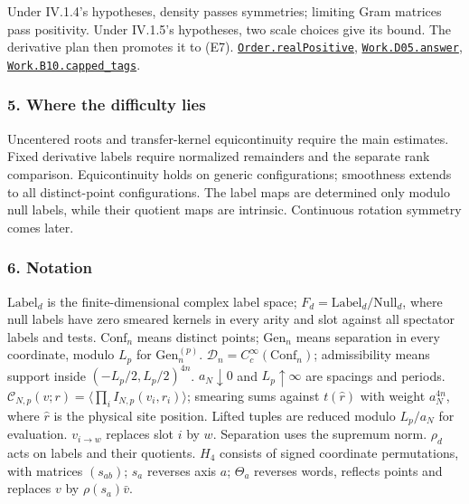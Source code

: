 \documentclass[
  letterpaper,
  11pt]{article}
\begin{document}
\begin{enumerate}
  Under IV.1.4's hypotheses, density passes symmetries; limiting Gram
  matrices pass positivity. Under IV.1.5's hypotheses, two scale choices
  give its bound. The derivative plan then promotes it to (E7).
  \href{https://github.com/yang-mills-group/OpenAI-YM-20261028/blob/3456e5e75cf8d4cd558955a5c7638fba2d68f464/YM/Extraction/Harvest.lean\#L46-L60}{\texttt{Order.realPositive}},
  \href{https://github.com/yang-mills-group/OpenAI-YM-20261028/blob/3456e5e75cf8d4cd558955a5c7638fba2d68f464/YM/Work/D05.lean\#L160-L180}{\texttt{Work.D05.answer}},
  \href{https://github.com/yang-mills-group/OpenAI-YM-20261028/blob/3456e5e75cf8d4cd558955a5c7638fba2d68f464/YM/Work/B10.lean\#L72-L90}{\texttt{Work.B10.capped\_tags}}.
\end{enumerate}

\subsubsection{5. Where the difficulty
lies}\label{where-the-difficulty-lies-19}

Uncentered roots and transfer-kernel equicontinuity require the main
estimates. Fixed derivative labels require normalized remainders and the
separate rank comparison. Equicontinuity holds on generic
configurations; smoothness extends to all distinct-point configurations.
The label maps are determined only modulo null labels, while their
quotient maps are intrinsic. Continuous rotation symmetry comes later.

\subsubsection{6. Notation}\label{notation-19}

\(\mathrm{Label}_d\) is the finite-dimensional complex label space;
\(F_d=\mathrm{Label}_d/\mathrm{Null}_d\), where null labels have zero
smeared kernels in every arity and slot against all spectator labels and
tests. \(\mathrm{Conf}_n\) means distinct points; \(\mathrm{Gen}_n\)
means separation in every coordinate, modulo \(L_p\) for
\(\mathrm{Gen}^{(p)}_n\). \(\mathcal D_n=C_c^\infty(\mathrm{Conf}_n)\);
admissibility means support inside \((-L_p/2,L_p/2)^{4n}\).
\(a_N\downarrow0\) and \(L_p\uparrow\infty\) are spacings and periods.
\(\mathcal C_{N,p}(v;r)=\langle\prod_iI_{N,p}(v_i,r_i)\rangle\);
smearing sums against \(t(\widehat r)\) with weight \(a_N^{4n}\), where
\(\widehat r\) is the physical site position. Lifted tuples are reduced
modulo \(L_p/a_N\) for evaluation. \(v_{i\to w}\) replaces slot \(i\) by
\(w\). Separation uses the supremum norm. \(\rho_d\) acts on labels and
their quotients. \(H_4\) consists of signed coordinate permutations,
with matrices \((s_{ab})\); \(s_a\) reverses axis \(a\); \(\Theta_a\)
reverses words, reflects points and replaces \(v\) by
\(\rho(s_a)\bar v\).
\end{document}
